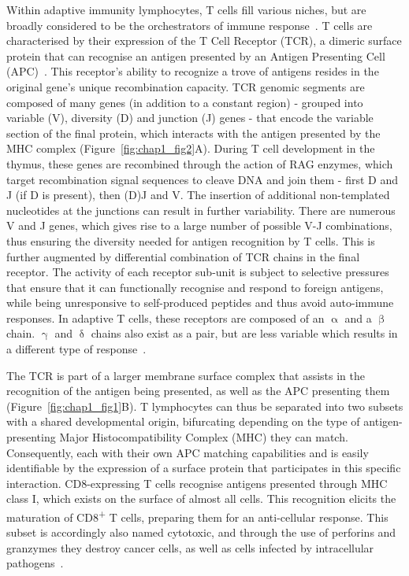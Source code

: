 Within adaptive immunity lymphocytes, T cells fill various niches, but are broadly considered to be the orchestrators of immune response~\citep{kumar_human_2018}. T cells are characterised by their expression of the T Cell Receptor (TCR), a dimeric surface protein that can recognise an antigen presented by an Antigen Presenting Cell (APC)~\citep{reinherz_revisiting_2014}. This receptor's ability to recognize a trove of antigens resides in the original gene's unique recombination capacity. TCR genomic segments are composed of many genes (in addition to a constant region) - grouped into variable (V), diversity (D) and junction (J) genes - that encode the variable section of the final protein, which interacts with the antigen presented by the MHC complex (Figure~\ref{fig:chap1_fig2}A). During T cell development in the thymus, these genes are recombined through the action of RAG enzymes, which target recombination signal sequences to cleave DNA and join them - first D and J (if D is present), then (D)J and V. The insertion of additional non-templated nucleotides at the junctions can result in further variability. There are numerous V and J genes, which gives rise to a large number of possible V-J combinations, thus ensuring the diversity needed for antigen recognition by T cells. This is further augmented by differential combination of TCR chains in the final receptor. The activity of each receptor sub-unit is subject to selective pressures that ensure that it can functionally recognise and respond to foreign antigens, while being unresponsive to self-produced peptides and thus avoid auto-immune responses. In adaptive T cells, these receptors are composed of an ${\upalpha}$ and a ${\upbeta}$ chain. ${\upgamma}$ and ${\updelta}$ chains also exist as a pair, but are less variable which results in a different type of response~\citep{simoes_molecular_2018}.

The TCR is part of a larger membrane surface complex that assists in the recognition of the antigen being presented, as well as the APC presenting them (Figure~\ref{fig:chap1_fig1}B). T lymphocytes can thus be separated into two subsets with a shared developmental origin, bifurcating depending on the type of antigen-presenting Major Histocompatibility Complex (MHC) they can match. Consequently, each with their own APC matching capabilities and is easily identifiable by the expression of a surface protein that participates in this specific interaction. CD8-expressing T cells recognise antigens presented through MHC class I, which exists on the surface of almost all cells. This recognition elicits the maturation of CD8\textsuperscript{+} T cells, preparing them for an anti-cellular response. This subset is accordingly also named cytotoxic, and through the use of perforins and granzymes they destroy cancer cells, as well as cells infected by intracellular pathogens~\citep{halle_mechanisms_2017}.

